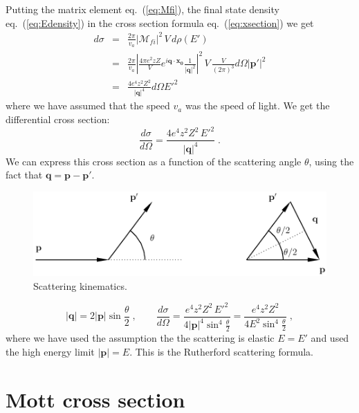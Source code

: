 \documentclass[12pt]{article}
\newcommand{\V}[1]{\mathbf{#1}}
\begin{document}
Putting the matrix element eq.~(\ref{eq:Mfi}), the final state density eq.~(\ref{eq:Edensity}) in the cross section formula eq.~(\ref{eq:xsection}) we get
\begin{eqnarray*}
d	\sigma&=&\frac{2\pi}{v_a}\left|\mathcal{M}_{fi}\right|^2\,V\,d\rho(E')  \nonumber\\
&=& \frac{2\pi}{v_a} \left|\frac{4\pi e^2zZ}{V}e^{i\V{q}\cdot \V{x_0}}  \frac{1}{|\V{q	}|^2}\right|^2\,V\,\frac{V}{(2\pi)^3} d\Omega |\V{p'}|^2 
\nonumber\\
&=&\frac{4e^4z^2Z^2}{|\V{q}|^4} d\Omega E'^2 
\end{eqnarray*}
where we have assumed that the speed $v_a$ was the speed of light. We get the differential cross section:
\begin{equation}
\frac{d\sigma}{d\Omega}=\frac{4e^4z^2Z^2 \,E'^2}{|\V{q}|^4}  \;.
\end{equation}
We can express this cross section as a function of the scattering angle $\theta$, using the fact that $\V{q}=\V{p}-\V{p'}$.
\begin{figure}
\begin{center}
\includegraphics[scale=0.45]{images/ppprimeq.png}
\end{center}
\caption{Scattering kinematics.}\label{fig:rutherfordKin}
\end{figure}
\[|\V{q}|=2 |\V{p}|\sin\frac{\theta}{2}\;,\qquad \frac{d\sigma}{d\Omega}=\frac{e^4z^2Z^2 \,E'^2}{4|\V{p}|^4\sin^4\frac{\theta}{2}}= \frac{e^4z^2Z^2}{4E^2\sin^4\frac{\theta}{2}}\;, \]
where we have used the assumption the the scattering is elastic $E=E'$ and used the high energy limit $|\V{p}|=E$. This is the Rutherford scattering formula.
\pagebreak 
%
%
\section{Mott cross section}
\end{document}
